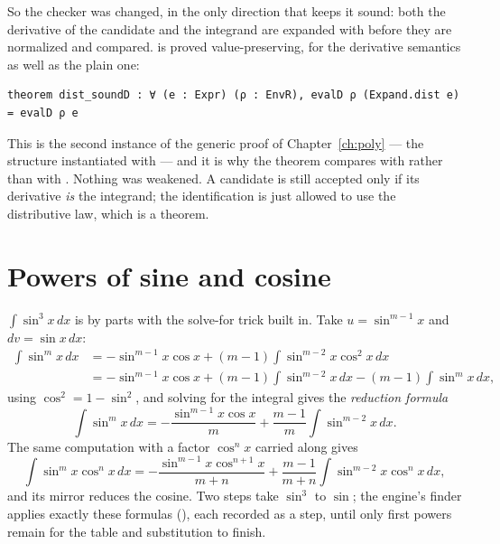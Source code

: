 So the checker was changed, in the only direction that keeps it sound: both the derivative of
the candidate and the integrand are expanded with  before they are normalized
and compared.  is proved value-preserving, for the derivative semantics as well as the
plain one:

\begin{verbatim}
theorem dist_soundD : ∀ (e : Expr) (ρ : EnvR), evalD ρ (Expand.dist e) = evalD ρ e
\end{verbatim}

This is the second instance of the generic proof of Chapter~\ref{ch:poly} --- the structure
 instantiated with  --- and it is why the theorem 
compares  with  rather than  with
. Nothing was weakened. A candidate is still accepted only if its derivative \emph{is} the
integrand; the identification is just allowed to use the distributive law, which is a theorem.

\section{Powers of sine and cosine}

$\int \sin^3 x\,dx$ is by parts with the solve-for trick built in. Take $u = \sin^{m-1} x$ and
$dv = \sin x\,dx$:
\begin{align*}
  \int \sin^m x\,dx &= -\sin^{m-1} x \cos x + (m-1)\int \sin^{m-2} x \cos^2 x\,dx \\
    &= -\sin^{m-1} x \cos x + (m-1)\int \sin^{m-2} x\,dx - (m-1)\int \sin^m x\,dx,
\end{align*}
using $\cos^2 = 1 - \sin^2$, and solving for the integral gives the \emph{reduction formula}
\[
  \int \sin^m x\,dx = -\frac{\sin^{m-1} x \cos x}{m} + \frac{m-1}{m} \int \sin^{m-2} x\,dx .
\]
The same computation with a factor $\cos^n x$ carried along gives
\[
  \int \sin^m x \cos^n x\,dx = -\frac{\sin^{m-1} x\cos^{n+1} x}{m+n} + \frac{m-1}{m+n}\int \sin^{m-2} x\cos^n x\,dx,
\]
and its mirror reduces the cosine. Two steps take $\sin^3$ to $\sin$; the engine's finder applies
exactly these formulas (), each recorded as a step, until only first powers
remain for the table and substitution to finish.

